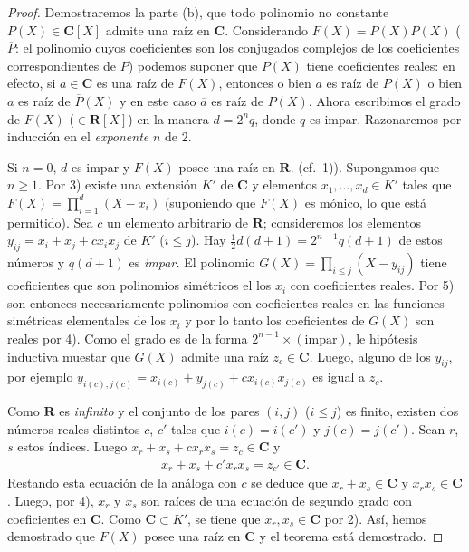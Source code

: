 \documentclass[10pt,oneside,bibtotoc,smallheadings,leqno,a5paper,DIV=12]{scrbook}
\newcommand{\RR}{\mathbf{R}}
\newcommand{\CC}{\mathbf{C}}
\newcommand{\oline}[1]{\overline{#1}}
\numberwithin{equation}{section}
\theoremstyle{defi}
\theoremstyle{enonce}
\theoremstyle{rem}
\numberwithin{theorem}{section}
\numberwithin{proposition}{section}
\numberwithin{definition}{section}
\numberwithin{lemma}{section}
\numberwithin{corollary}{section}
\numberwithin{example}{section}
\numberwithin{footnote}{section}%
\begin{document}
\begin{proof}
Demostraremos la parte (b), que todo polinomio no constante $P(X)\in\CC[X]$ admite una ra\'iz en
$\CC$. Considerando $F(X) = P(X)\oline P(X)$ ($\oline P$: el polinomio cuyos coeficientes son los
conjugados complejos de los coeficientes correspondientes de $P$) podemos suponer que $P(X)$ tiene
coeficientes reales: en efecto, si $a\in\CC$ es una ra\'iz de $F(X)$, entonces o bien $a$ es ra\'iz
de $P(X)$ o bien $a$ es ra\'iz de $\oline P(X)$ y en este caso $\oline a$ es ra\'iz de $P(X)$.
Ahora escribimos el grado de $F(X)$ ($\in\RR[X]$) en la manera $d = 2^{n}q$, donde $q$ es impar.
Razonaremos por inducci\'on en el {\em exponente} $n$ de $2$.

Si $n = 0$, $d$ es impar y
$F(X)$ posee una ra\'iz en $\RR$. (cf.~1)). Supongamos que $n \geq 1$. Por 3) existe una extensi\'on
$K'$ de $\CC$ y elementos $x_{1},\dots,x_{d}\in K'$ tales que $F(X) = \prod_{i=1}^{d}(X-x_{i})$
(suponiendo que $F(X)$ es m\'onico, lo que est\'a permitido). Sea $c$ un elemento arbitrario de $\RR$;
consideremos los elementos $y_{ij} = x_{i}+x_{j}+cx_{i}x_{j}$ de $K'$ ($i\leq j$). Hay
$\frac{1}{2}d(d+1) = 2^{n-1}q(d+1)$ de estos n\'umeros y $q(d+1)$ es {\em impar.} El polinomio
$G(X) = \prod_{i\leq j}(X-y_{ij})$ tiene coeficientes que son polinomios sim\'etricos el los $x_{i}$
con coeficientes reales. Por 5) son entonces necesariamente polinomios con coeficientes reales
en las funciones sim\'etricas elementales de los $x_{i}$ y por lo tanto los coeficientes de $G(X)$
son reales por 4). Como el grado es de la forma $2^{n-1}\times(\text{impar})$, le hip\'otesis
inductiva muestar que $G(X)$ admite una ra\'iz $z_{c}\in\CC$. Luego, alguno de los $y_{ij}$,
por ejemplo $y_{i(c),j(c)} = x_{i(c)}+y_{j(c)}+cx_{i(c)}x_{j(c)}$ es igual a $z_{c}$.

Como $\RR$ es {\em infinito} y el conjunto de los pares $(i,j)$ ($i\leq j$) es finito, existen
dos n\'umeros reales distintos $c$, $c'$ tales que $i(c) = i(c')$ y $j(c) = j(c')$. Sean $r$, $s$
estos \'indices. Luego $x_{r}+x_{s}+cx_{r}x_{s} = z_{c}\in\CC$ y
\begin{gather*}
x_{r}+x_{s}+c'x_{r}x_{s}=z_{c'}\in\CC.
\end{gather*}
Restando esta ecuaci\'on de la an\'aloga con $c$ se deduce que $x_{r}+x_{s}\in\CC$ y $x_{r}x_{s}\in\CC$.
Luego, por 4), $x_{r}$ y $x_{s}$ son ra\'ices de una ecuaci\'on de segundo grado con coeficientes
en $\CC$. Como $\CC\subset K'$, se tiene que $x_{r},x_{s}\in\CC$ por 2). As\'i, hemos demostrado que
$F(X)$ posee una ra\'iz en $\CC$ y el teorema est\'a demostrado.
\end{proof}
\end{document}
